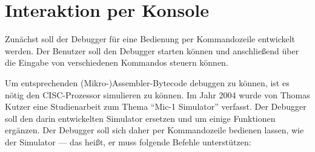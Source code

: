 \chapter{Interaktion per Konsole}
Zunächst soll der Debugger für eine Bedienung per Kommandozeile entwickelt werden. Der Benutzer soll den Debugger starten können und anschließend über die Eingabe von verschiedenen Kommandos steuern können.

Um entsprechenden (Mikro-)Assembler-Bytecode debuggen zu können, ist es nötig den CISC-Prozessor simulieren zu können. Im Jahr 2004 wurde von Thomas Kutzer eine Studienarbeit zum Thema ``Mic-1 Simulator'' verfasst. Der Debugger soll den darin entwickelten Simulator ersetzen und um einige Funktionen ergänzen. Der Debugger soll sich daher per Kommandozeile bedienen lassen, wie der Simulator --- das heißt, er muss folgende Befehle unterstützen:
